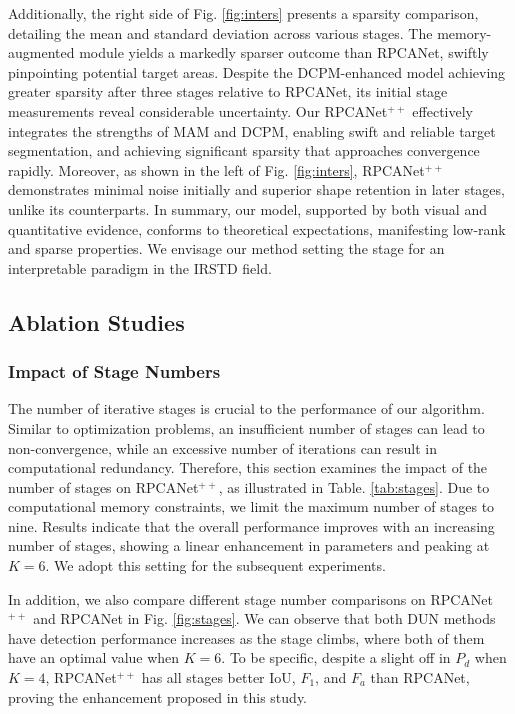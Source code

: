 \documentclass[10pt,journal,compsoc]{IEEEtran}
\begin{document}
Additionally, the right side of Fig. \ref{fig:inters} presents a sparsity comparison, detailing the mean and standard deviation across various stages. The memory-augmented module yields a markedly sparser outcome than RPCANet, swiftly pinpointing potential target areas. Despite the DCPM-enhanced model achieving greater sparsity after three stages relative to RPCANet, its initial stage measurements reveal considerable uncertainty.
Our RPCANet$^{++}$ effectively integrates the strengths of MAM and DCPM, enabling swift and reliable target segmentation, and achieving significant sparsity that approaches convergence rapidly. Moreover, as shown in the left of Fig. \ref{fig:inters}, RPCANet$^{++}$ demonstrates minimal noise initially and superior shape retention in later stages, unlike its counterparts.
In summary, our model, supported by both visual and quantitative evidence, conforms to theoretical expectations, manifesting low-rank and sparse properties. We envisage our method setting the stage for an interpretable paradigm in the IRSTD field.




\subsection{Ablation Studies}
\subsubsection{Impact of Stage Numbers}
The number of iterative stages is crucial to the performance of our algorithm. Similar to optimization problems, an insufficient number of stages can lead to non-convergence, while an excessive number of iterations can result in computational redundancy. Therefore, this section examines the impact of the number of stages on RPCANet$^{++}$, as illustrated in Table. \ref{tab:stages}. Due to computational memory constraints, we limit the maximum number of stages to nine. Results indicate that the overall performance improves with an increasing number of stages, showing a linear enhancement in parameters and peaking at $K=6$. We adopt this setting for the subsequent experiments. 

In addition, we also compare different stage number comparisons on RPCANet$^{++}$ and RPCANet in Fig. \ref{fig:stages}. We can observe that both DUN methods have detection performance increases as the stage climbs, where both of them have an optimal value when $K=6$. To be specific, despite a slight off in $P_d$ when $K=4$, RPCANet$^{++}$ has all stages better IoU, $F_1$, and $F_a$ than RPCANet, proving the enhancement proposed in this study.
\end{document}

